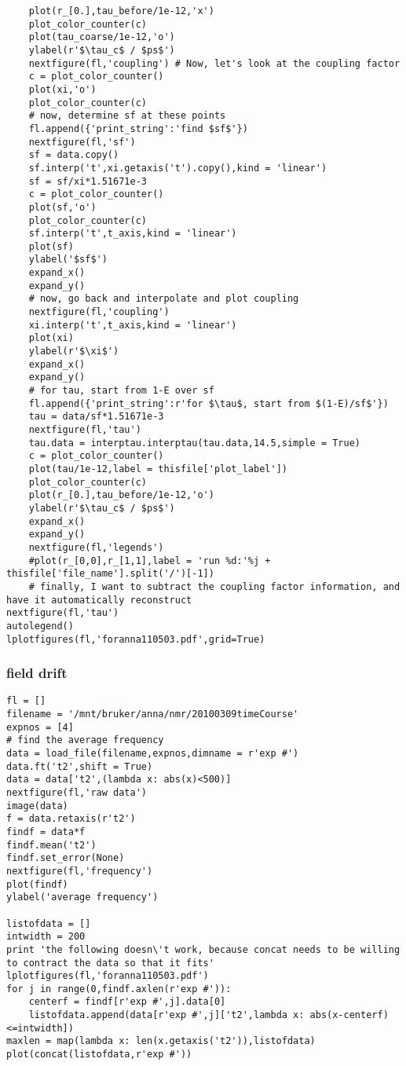 \begin{lstlisting}
    plot(r_[0.],tau_before/1e-12,'x')
    plot_color_counter(c)
    plot(tau_coarse/1e-12,'o')
    ylabel(r'$\tau_c$ / $ps$')
    nextfigure(fl,'coupling') # Now, let's look at the coupling factor
    c = plot_color_counter()
    plot(xi,'o')
    plot_color_counter(c)
    # now, determine sf at these points
    fl.append({'print_string':'find $sf$'})
    nextfigure(fl,'sf')
    sf = data.copy()
    sf.interp('t',xi.getaxis('t').copy(),kind = 'linear')
    sf = sf/xi*1.51671e-3
    c = plot_color_counter()
    plot(sf,'o')
    plot_color_counter(c)
    sf.interp('t',t_axis,kind = 'linear')
    plot(sf)
    ylabel('$sf$')
    expand_x()
    expand_y()
    # now, go back and interpolate and plot coupling
    nextfigure(fl,'coupling')
    xi.interp('t',t_axis,kind = 'linear')
    plot(xi)
    ylabel(r'$\xi$')
    expand_x()
    expand_y()
    # for tau, start from 1-E over sf
    fl.append({'print_string':r'for $\tau$, start from $(1-E)/sf$'})
    tau = data/sf*1.51671e-3
    nextfigure(fl,'tau')
    tau.data = interptau.interptau(tau.data,14.5,simple = True)
    c = plot_color_counter()
    plot(tau/1e-12,label = thisfile['plot_label'])
    plot_color_counter(c)
    plot(r_[0.],tau_before/1e-12,'o')
    ylabel(r'$\tau_c$ / $ps$')
    expand_x()
    expand_y()
    nextfigure(fl,'legends')
    #plot(r_[0,0],r_[1,1],label = 'run %d:'%j + thisfile['file_name'].split('/')[-1])
    # finally, I want to subtract the coupling factor information, and have it automatically reconstruct
nextfigure(fl,'tau')
autolegend()
lplotfigures(fl,'foranna110503.pdf',grid=True)
\end{lstlisting}
\subsubsection{field drift}

\begin{lstlisting}
fl = []
filename = '/mnt/bruker/anna/nmr/20100309timeCourse'
expnos = [4]
# find the average frequency
data = load_file(filename,expnos,dimname = r'exp #')
data.ft('t2',shift = True)
data = data['t2',(lambda x: abs(x)<500)]
nextfigure(fl,'raw data')
image(data)
f = data.retaxis(r't2')
findf = data*f
findf.mean('t2')
findf.set_error(None)
nextfigure(fl,'frequency')
plot(findf)
ylabel('average frequency')

listofdata = []
intwidth = 200
print 'the following doesn\'t work, because concat needs to be willing to contract the data so that it fits'
lplotfigures(fl,'foranna110503.pdf')
for j in range(0,findf.axlen(r'exp #')):
    centerf = findf[r'exp #',j].data[0]
    listofdata.append(data[r'exp #',j]['t2',lambda x: abs(x-centerf)<=intwidth])
maxlen = map(lambda x: len(x.getaxis('t2')),listofdata)
plot(concat(listofdata,r'exp #'))
\end{lstlisting}
